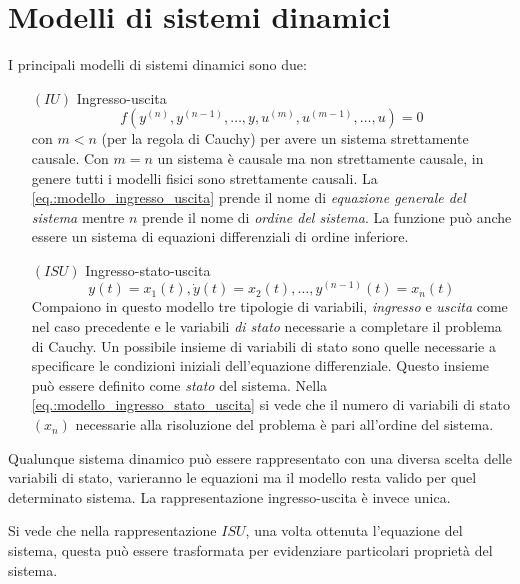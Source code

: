 \chapter{Modelli di sistemi dinamici}
I principali modelli di sistemi dinamici sono due:
\begin{itemize}
\item [$(IU)$]Ingresso-uscita
\begin{equation}
f\left(y^{(n)},y^{(n-1)},\ldots,y,u^{(m)},u^{(m-1)},\ldots,u\right)=0
\label{eq.:modello_ingresso_uscita}
\end{equation}
con $m<n$ (per la regola di Cauchy) per avere un sistema strettamente causale. Con $m=n$ un sistema
è causale ma non strettamente causale, in genere tutti i modelli fisici sono strettamente causali.
La \ref{eq.:modello_ingresso_uscita} prende il nome di \textit{equazione generale del sistema}
mentre $n$
prende il nome di \textit{ordine del sistema}.
La funzione può anche essere un sistema di equazioni differenziali di ordine inferiore.
\item[$(ISU)$] Ingresso-stato-uscita
\begin{equation}
y(t) = x_1(t), \dot{y}(t) = x_2(t),\ldots,y^{(n-1)}(t)=x_n(t)
\label{eq.:modello_ingresso_stato_uscita}
\end{equation}
Compaiono in questo modello tre tipologie di variabili, \textit{ingresso} e \textit{uscita} come nel
caso precedente e le variabili \textit{di stato} necessarie a completare il problema di Cauchy.
Un possibile insieme di variabili di stato sono quelle necessarie a specificare le condizioni
iniziali dell'equazione differenziale. Questo insieme può essere definito come \textit{stato} del
sistema.
Nella \ref{eq.:modello_ingresso_stato_uscita} si vede che il numero di variabili di stato $(x_n)$
necessarie alla risoluzione del problema è pari all'ordine del sistema.
\end{itemize}

Qualunque sistema dinamico può essere rappresentato con una diversa scelta delle variabili di
stato, varieranno le equazioni ma il modello resta valido per quel determinato sistema. La
rappresentazione ingresso-uscita è invece unica.

Si vede che nella rappresentazione $ISU$, una volta ottenuta l'equazione del sistema, questa può
essere trasformata per evidenziare particolari proprietà del sistema.

\newpage
